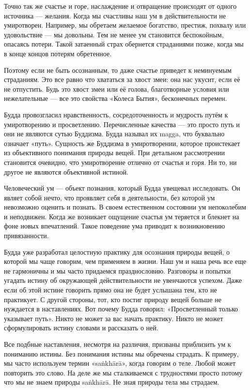 Точно так же счастье и горе, наслаждение и отвращение происходят от одного источника — желания. Когда мы счастливы наш ум в действительности не умиротворен. Например, мы обретаем желаемое богатство, престиж, похвалу или удовольствие — мы довольны. Тем не менее ум становится беспокойным, опасаясь потери. Такой затаенный страх обернется страданиями позже, когда мы в конце концов потерям обретенное.

Поэтому если не быть осознанным, то даже счастье приведет к неминуемым страданиям. Это все равно что хвататься за хвост змеи: она нас укусит, если её не отпустить. Будь это хвост змеи или её голова, благотворные условия или нежелательные — все это свойства «Колеса Бытия», бесконечных перемен.

Будда провозгласил нравственность, сосредоточенность и мудрость путём к умиротворению и просветлению. Перечисленные качества — это просто путь и они не являются сутью Буддизма. Будда называл их magga, что буквально означает «путь». Сущность же Буддизма в умиротворении, которое проистекает из объективного понимания природы вещей. При детальном рассмотрении становится очевидно, что умиротворение отлично от счастья и горя. Ни то, ни другое не являются объективной истиной.

Человеческий ум — объект познания, который Будда увещевал исследовать. Он являет собой нечто, что проявляет себя в деятельности, без которой ум невозможно оценить и познать. В своем естественном состоянии ум непоколебим и неподвижен. Когда же возникает ощущение счастья ум теряется и блекнет на фоне новых впечатлений. Такое поведение ума приводит к возникновению привязанности.

Будда уже разработал целостную практику для осознания природы вещей, о которой мы чаще говорим, чем применяем в жизни. Наш ум и наша речь все еще не гармоничны и мы часто придаемся празднословию. Разговоры и попытки угадать истину об окружающей действительности не увенчаются успехом. Даже если об этой истине говорить прямо она не будет услышана тем, кто не практикует. С другой стороны, тот, кто постиг природу вещей больше не нуждается в наставлениях. Вот почему Будда говорил: «Просветленный только указывает путь». Никто не может за вас начать практику. Никто не может сформулировать истину словами и рассказать о ней.

Все подбные наставления, несмотря на различия, призваны приблизить ум к пониманию истины. Без понимания истины мы обречены страдать. К примеру, мы часто используем термин «sa\.nkh\={a}r\={a}», когда говорим о теле. Любой может повторить это слово. На деле же мы сталкиваемся с трудностями просто потому что мы не знаем природы  sa\.nkh\={a}r\={a}. Не зная природы тела мы страдаем.


